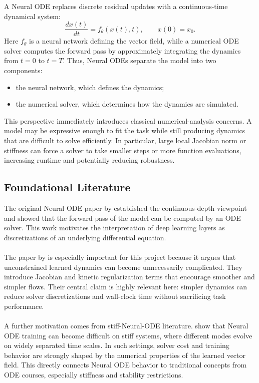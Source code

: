 \documentclass[11pt]{article}
\begin{document}
A Neural ODE replaces discrete residual updates with a continuous-time dynamical system:
\begin{equation}
\frac{d x(t)}{dt} = f_{\theta}(x(t), t), \qquad x(0) = x_0.
\end{equation}
Here $f_{\theta}$ is a neural network defining the vector field, while a numerical ODE solver computes the forward pass by approximately integrating the dynamics from $t=0$ to $t=T$. Thus, Neural ODEs separate the model into two components:
\begin{itemize}[leftmargin=2em]
    \item the neural network, which defines the dynamics;
    \item the numerical solver, which determines how the dynamics are simulated.
\end{itemize}
This perspective immediately introduces classical numerical-analysis concerns. A model may be expressive enough to fit the task while still producing dynamics that are difficult to solve efficiently. In particular, large local Jacobian norm or stiffness can force a solver to take smaller steps or more function evaluations, increasing runtime and potentially reducing robustness.

\subsection{Foundational Literature}

The original Neural ODE paper by \citet{chen2018neuralode} established the continuous-depth viewpoint and showed that the forward pass of the model can be computed by an ODE solver. This work motivates the interpretation of deep learning layers as discretizations of an underlying differential equation.\\\\
The paper by \citet{finlay2020trainnode} is especially important for this project because it argues that unconstrained learned dynamics can become unnecessarily complicated. They introduce Jacobian and kinetic regularization terms that encourage smoother and simpler flows. Their central claim is highly relevant here: simpler dynamics can reduce solver discretizations and wall-clock time without sacrificing task performance.\\\\
A further motivation comes from stiff-Neural-ODE literature. \citet{kim2021stiffnode} show that Neural ODE training can become difficult on stiff systems, where different modes evolve on widely separated time scales. In such settings, solver cost and training behavior are strongly shaped by the numerical properties of the learned vector field. This directly connects Neural ODE behavior to traditional concepts from ODE courses, especially stiffness and stability restrictions.
\end{document}
